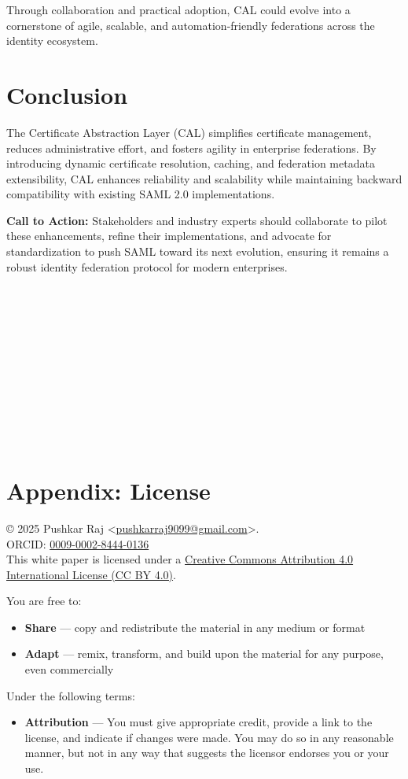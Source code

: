 \documentclass{article}
\begin{document}
Through collaboration and practical adoption, CAL could evolve into a cornerstone of agile, scalable, and automation-friendly federations across the identity ecosystem.\\

\section*{Conclusion}
The Certificate Abstraction Layer (CAL) simplifies certificate management, reduces administrative effort, and fosters agility in enterprise federations. By introducing dynamic certificate resolution, caching, and federation metadata extensibility, CAL enhances reliability and scalability while maintaining backward compatibility with existing SAML 2.0 implementations.

\textbf{Call to Action:} Stakeholders and industry experts should collaborate to pilot these enhancements, refine their implementations, and advocate for standardization to push SAML toward its next evolution, ensuring it remains a robust identity federation protocol for modern enterprises. \\ \\ \\ \\ \\ \\ \\ \\ \\ \\ \\ \\


\appendix
\section*{Appendix: License}

\noindent
© 2025 Pushkar Raj \textless\href{mailto:pushkarraj9099@gmail.com}{pushkarraj9099@gmail.com}\textgreater. \\
ORCID: \href{https://orcid.org/0009-0002-8444-0136}{0009-0002-8444-0136}\\
This white paper is licensed under a 
\href{https://creativecommons.org/licenses/by/4.0/}{Creative Commons Attribution 4.0 International License (CC BY 4.0)}.

\medskip

\noindent
You are free to:
\begin{itemize}
  \item \textbf{Share} — copy and redistribute the material in any medium or format
  \item \textbf{Adapt} — remix, transform, and build upon the material for any purpose, even commercially
\end{itemize}

\noindent
Under the following terms:
\begin{itemize}
  \item \textbf{Attribution} — You must give appropriate credit, provide a link to the license, and indicate if changes were made. You may do so in any reasonable manner, but not in any way that suggests the licensor endorses you or your use.
\end{itemize}
\end{document}
